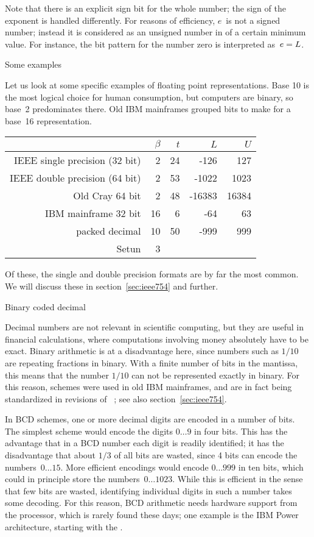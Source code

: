 Note that there is an explicit sign bit for the whole number; the sign
of the exponent is handled differently. 
For reasons of efficiency, $e$~is not a signed number; instead it is
considered as an unsigned number in  of a certain minimum
value. For instance, the bit pattern for the number zero is
interpreted as~$e=\nobreak L$.

 {Some examples}

Let us look at some specific examples of floating point
representations. Base 10 is the most logical choice for human
consumption, but computers are binary, so base~2 predominates
there. Old IBM mainframes grouped bits to make for a base~16
representation.

\begin{tabular}{r|r|r|r|r}
  &$\beta$&$t$&$L$&$U$\\ \hline
  IEEE single precision (32 bit)&2&24&-126&127\\
  IEEE double precision (64 bit)&2&53&-1022&1023\\
  Old Cray 64 bit&2&48&-16383&16384\\
  IBM mainframe 32 bit&16&6&-64&63\\
  packed decimal&10&50&-999&999\\
  Setun&3
\end{tabular}

Of these, the single and double precision formats are by far the most
common. We will discuss these in section~\ref{sec:ieee754} and
further.

 {Binary coded decimal}
\label{sec:bcd}

Decimal numbers are not relevant in scientific computing, but they are
useful in financial calculations, where computations involving money
absolutely have to be exact. Binary arithmetic is at a disadvantage
here, since numbers such as $1/10$ are repeating fractions in
binary. With a finite number of bits in the mantissa,
this means that the number $1/10$ can not be represented exactly in
binary.  For this reason,  schemes
were used in old IBM mainframes, and are in fact being
standardized in revisions of ~\cite{ieee754-webpage}; see also
section~\ref{sec:ieee754}.

In BCD schemes, one or more decimal digits are encoded in a number of
bits. The simplest scheme would encode the digits $0\ldots9$ in four
bits. This has the advantage that in a
BCD number each digit is readily identified; it has the disadvantage
that about $1/3$ of all bits are wasted, since 4 bits can
encode the numbers~$0\ldots15$.
%
More efficient encodings would encode $0\ldots999$ in ten bits, which
could in principle store the numbers~$0\ldots1023$. While this is
efficient in the sense that few bits are wasted, identifying
individual digits in such a number takes some decoding. For this
reason, BCD arithmetic needs hardware support from the processor,
which is rarely found these days; one example is the IBM
Power architecture, starting with the .

